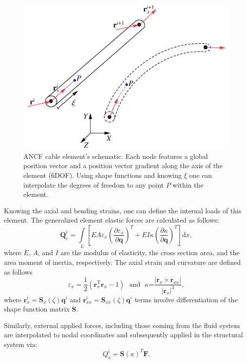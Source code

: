 \begin{figure}[!t]
	\begin{center}
				\includegraphics[width=.6\linewidth]{images/ANCF_1D.pdf}
	\end{center}
\caption{ANCF cable element's schematic. Each node features a global position vector and a position vector gradient along the axis of the element (6DOF). Using shape functions and knowing $\xi$ one can interpolate the degrees of freedom to any point $P$ within the element. } \label{fig:ANCFCable}
\end{figure}


Knowing the axial and bending strains, one can define the internal loads of this element. 
The generalized element elastic forces are calculated as follows:
\begin{equation} \label{eq:ANCF_Beam_Qe}
\mathbf{Q}^i_{e}=\int\limits_{L}{\left[ EA \varepsilon_{x} ({\frac{{\partial \varepsilon }_{x}}{\partial \mathbf{q}}})^T+EI\kappa ({\frac{\partial \kappa}{\partial \mathbf{q}}})^T  \right]}\text{d}x,
\end{equation}
where $E$, $A$, and $I$ are the modulus of elasticity, the cross section area, and the area moment of inertia, respectively. The axial strain and curvature are defined as follows
\begin{equation*} \label{eq:ANCF_Beam_ex_k}
{{\varepsilon }_{x}}=\frac{1}{2}\left( \bm{r}_{x}^{\text{T}}\bm{r}_{x}^{{}}-1 \right) \text{  } \text{and} \text{  } \kappa \text{=}\frac{\left| {{\bm{r}}_{x}}\times {{\bm{r}}_{xx}} \right|}{{{\left| {{\bm{r}}_{x}} \right|}^{3}}},
\end{equation*}
where $\bm{r}^i_{x}=\bm{S}_x(\zeta) \bm{q}^i$ and $\bm{r}^i_{xx}=\bm{S}_{xx}(\zeta) \bm{q}^i$ terms involve differentiation of the shape function matrix $\bm S$.

Similarly, external applied forces, including those coming from the fluid system are interpolated to nodal coordinates and subsequently applied in the structural system via:
 \begin{equation} \label{eq:ANCF_Beam_Qa}
 Q^i_a = \bm S(x)^T \bm F.
 \end{equation}

